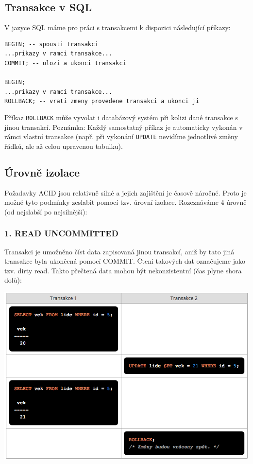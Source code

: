 \documentclass[10pt,a4paper]{article}
\begin{document}
\subsection*{Transakce v SQL}
V jazyce SQL máme pro práci s transakcemi k dispozici následující příkazy:
\begin{lstlisting}
BEGIN; -- spousti transakci
...prikazy v ramci transakce...
COMMIT; -- ulozi a ukonci transakci

BEGIN;
...prikazy v ramci transakce...
ROLLBACK; -- vrati zmeny provedene transakci a ukonci ji
\end{lstlisting}
Příkaz \texttt{ROLLBACK} může vyvolat i databázový systém při kolizi dané transakce s jinou transakcí.
Poznámka: Každý samostatný příkaz je automaticky vykonán v rámci vlastní transakce (např. při vykonání \texttt{UPDATE} nevidíme jednotlivé změny řádků, ale až celou upravenou tabulku).

\subsection*{Úrovně izolace}
Požadavky ACID jsou relativně silné a jejich zajištění je časově náročné. Proto je možné tyto podmínky zeslabit pomocí tzv. úrovní izolace. Rozeznáváme 4 úrovně (od nejslabší po nejsilnější):

\subsubsection*{1. READ UNCOMMITTED}
Transakci je umožněno číst data zapisovaná jinou transakcí, aniž by tato jiná transakce byla ukončená pomocí COMMIT. Čtení takových dat označujeme jako tzv. dirty read. Takto přečtená data mohou být nekonzistentní (čas plyne shora dolů):

\includegraphics[scale=0.5]{img/ReadUncommited}
\end{document}
